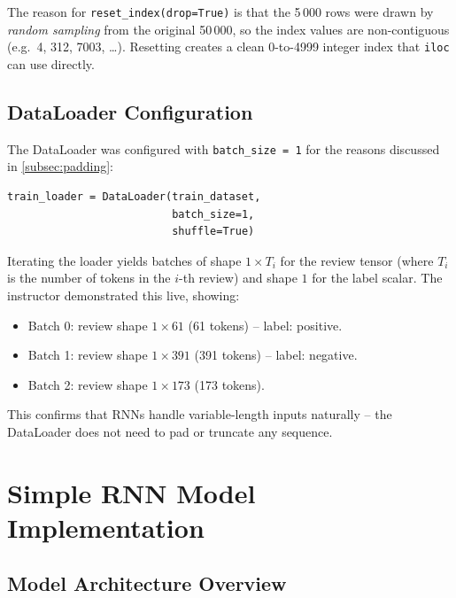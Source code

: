 \documentclass[12pt,a4paper]{article}
\begin{document}
The reason for \texttt{reset\_index(drop=True)} is that the 5\,000
rows were drawn by \emph{random sampling} from the original 50\,000,
so the index values are non-contiguous (e.g.\ 4, 312, 7003, \ldots).
Resetting creates a clean 0-to-4999 integer index that \texttt{iloc}
can use directly.

\subsection{DataLoader Configuration}
\label{subsec:dataloader}

The DataLoader was configured with \texttt{batch\_size = 1} for the
reasons discussed in \cref{subsec:padding}:

\begin{verbatim}
train_loader = DataLoader(train_dataset,
                          batch_size=1,
                          shuffle=True)
\end{verbatim}

Iterating the loader yields batches of shape
$1 \times T_i$ for the review tensor (where $T_i$ is the number of
tokens in the $i$-th review) and shape $1$ for the label scalar.  The
instructor demonstrated this live, showing:

\begin{itemize}[noitemsep]
  \item Batch 0: review shape $1 \times 61$ (61 tokens) -- label: positive.
  \item Batch 1: review shape $1 \times 391$ (391 tokens) -- label: negative.
  \item Batch 2: review shape $1 \times 173$ (173 tokens).
\end{itemize}

This confirms that RNNs handle variable-length inputs naturally -- the
DataLoader does not need to pad or truncate any sequence.

\section{Simple RNN Model Implementation}
\label{sec:model}

\subsection{Model Architecture Overview}
\label{subsec:model_overview}
\end{document}
